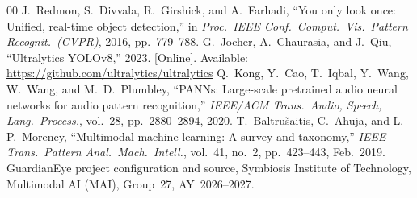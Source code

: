 \documentclass[conference]{IEEEtran}
\begin{document}
\begin{thebibliography}{00}
 J.~Redmon, S.~Divvala, R.~Girshick, and A.~Farhadi, ``You only look once: Unified, real-time object detection,'' in \textit{Proc.\ IEEE Conf.\ Comput.\ Vis.\ Pattern Recognit.\ (CVPR)}, 2016, pp.\ 779--788.
 G.~Jocher, A.~Chaurasia, and J.~Qiu, ``Ultralytics YOLOv8,'' 2023. [Online]. Available: \url{https://github.com/ultralytics/ultralytics}
 Q.~Kong, Y.~Cao, T.~Iqbal, Y.~Wang, W.~Wang, and M.~D.~Plumbley, ``PANNs: Large-scale pretrained audio neural networks for audio pattern recognition,'' \textit{IEEE/ACM Trans.\ Audio, Speech, Lang.\ Process.}, vol.~28, pp.\ 2880--2894, 2020.
 T.~Baltru\v{s}aitis, C.~Ahuja, and L.-P.~Morency, ``Multimodal machine learning: A survey and taxonomy,'' \textit{IEEE Trans.\ Pattern Anal.\ Mach.\ Intell.}, vol.~41, no.~2, pp.\ 423--443, Feb.~2019.
 GuardianEye project configuration and source, Symbiosis Institute of Technology, Multimodal AI (MAI), Group~27, AY~2026--2027.
\end{thebibliography}
\end{document}
